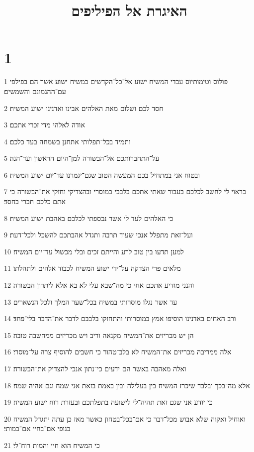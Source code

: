 

\title{האיגרת אל הפיליפים}


\chapter{1}

\par 1 פולוס וטימותיוס עבדי המשיח ישוע אל־כל־הקדשים במשיח ישוע אשר הם בפילפי עם־ההגמונם והשמשים׃
\par 2 חסד לכם ושלום מאת האלהים אבינו ואדנינו ישוע המשיח׃
\par 3 אודה לאלהי מדי זכרי אתכם׃
\par 4 ותמיד בכל־תפלותי אתחנן בשמחה בעד כלכם׃
\par 5 על־התחברותכם אל־הבשורה למן־היום הראשון ועד־הנה׃
\par 6 ובטוח אני במתחיל בכם המעשה הטוב שגם־יגמרנו עד־יום ישוע המשיח׃
\par 7 כראוי לי לחשב לכלכם בעבור שאתי אתכם בלבבי במוסרי ובהצדיקי וחזקי את־הבשורה כי אתם כלכם חברי בחסד׃
\par 8 כי האלהים לעד לי אשר נכספתי לכלכם באהבת ישוע המשיח׃
\par 9 ועל־זאת מתפלל אנכי שעוד תרבה ותגדל אהבתכם להשכל ולכל־דעת׃
\par 10 למען תדעו בין טוב לרע והייתם זכים ובלי מכשול עד־יום המשיח׃
\par 11 מלאים פרי הצדקה על־ידי ישוע המשיח לכבוד אלהים ולתהלתו׃
\par 12 והנני מודיע אתכם אחי כי מה־שבא עלי לא בא אלא ליתרון הבשורה׃
\par 13 עד אשר נגלו מוסרותי במשיח בכל־שער המלך ולכל הנשארים׃
\par 14 ורב האחים באדנינו הוסיפו אמץ במוסרותי והתחזקו בלבבם לדבר את־הדבר בלי־פחד׃
\par 15 הן יש מכריזים את־המשיח מקנאה וריב ויש מכריזים ממחשבה טובה׃
\par 16 אלה ממריבה מכריזים את־המשיח לא בלב־טהור כי חשבים להוסיף צרה על־מוסרי׃
\par 17 ואלה מאהבה באשר הם ידעים כי־נתון אנכי להצדיק את־הבשורה׃
\par 18 אלא מה־בכך ובלבד שיכרז המשיח בין בעלילה ובין באמת בזאת אני שמח וגם אהיה שמח׃
\par 19 כי יודע אני שגם זאת תהיה־לי לישועה בתפלתכם ובעזרת רוח ישוע המשיח׃
\par 20 ואוחיל ואקוה שלא אבוש מכל־דבר כי אם־בכל־בטחון כאשר מאז כן עתה יתגדל המשיח בגופי אם־בחיי אם־במותי׃
\par 21 כי המשיח הוא חיי והמות רוח־לי׃

